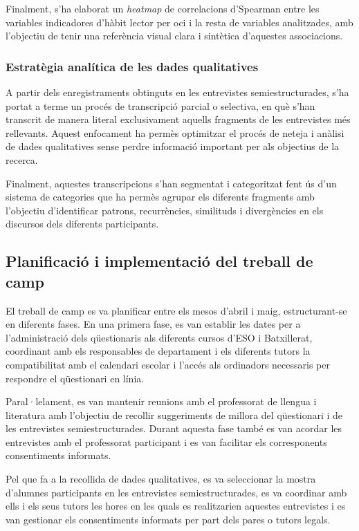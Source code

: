 \documentclass[12pt]{article}
\begin{document}
Finalment, s'ha elaborat un \emph{heatmap} de correlacions d'Spearman entre les variables indicadores d’hàbit lector per oci i la resta de variables analitzades, amb l'objectiu de tenir una referència visual clara i sintètica d'aquestes associacions.

\subsubsection{Estratègia analítica de les dades qualitatives}

A partir dels enregistraments obtinguts en les entrevistes semiestructurades, s'ha portat a terme un procés de transcripció parcial o selectiva, en què s'han transcrit de manera literal exclusivament aquells fragments de les entrevistes més rellevants. Aquest enfocament ha permès optimitzar el procés de neteja i anàlisi de dades qualitatives sense perdre informació important per als objectius de la recerca.

Finalment, aquestes transcripcions s'han segmentat i categoritzat fent ús d'un sistema de categories que ha permès agrupar els diferents fragments amb l’objectiu d'identificar patrons, recurrències, similituds i divergències en els discursos dels diferents participants.

\subsection{Planificació i implementació del treball de camp}

El treball de camp es va planificar entre els mesos d’abril i maig, estructurant-se en diferents fases. En una primera fase, es van establir les dates per a l’administració dels qüestionaris als diferents cursos d’ESO i Batxillerat, coordinant amb els responsables de departament i els diferents tutors la compatibilitat amb el calendari escolar i l’accés als ordinadors necessaris per respondre el qüestionari en línia. 

Paral·lelament, es van mantenir reunions amb el professorat de llengua i literatura amb l’objectiu de recollir suggeriments de millora del qüestionari i de les entrevistes semiestructurades. Durant aquesta fase també es van acordar les entrevistes amb el professorat participant i es van facilitar els corresponents consentiments informats.

Pel que fa a la recollida de dades qualitatives, es va seleccionar la mostra d’alumnes participants en les entrevistes semiestructurades, es va coordinar amb ells i els seus tutors les hores en les quals es realitzarien aquestes entrevistes i es van gestionar els consentiments informats per part dels pares o tutors legals.
\end{document}
